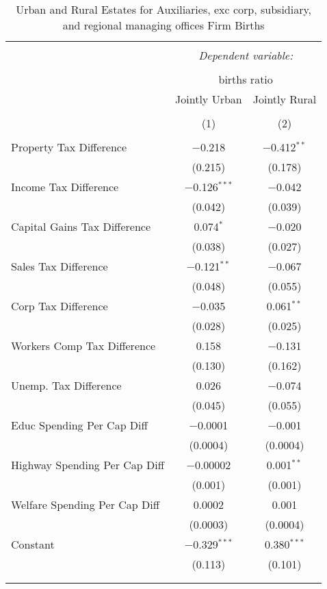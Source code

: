 
\begin{table}[!htbp] \centering 
  \caption{Urban and Rural Estates for  Auxiliaries, exc corp, subsidiary, and regional managing offices Firm Births} 
  \label{} 
\begin{tabular}{@{\extracolsep{5pt}}lcc} 
\\[-1.8ex]\hline 
\hline \\[-1.8ex] 
 & \multicolumn{2}{c}{\textit{Dependent variable:}} \\ 
\cline{2-3} 
\\[-1.8ex] & \multicolumn{2}{c}{births ratio} \\ 
 & Jointly Urban & Jointly Rural \\ 
\\[-1.8ex] & (1) & (2)\\ 
\hline \\[-1.8ex] 
 Property Tax Difference & $-$0.218 & $-$0.412$^{**}$ \\ 
  & (0.215) & (0.178) \\ 
  Income Tax Difference & $-$0.126$^{***}$ & $-$0.042 \\ 
  & (0.042) & (0.039) \\ 
  Capital Gains Tax Difference & 0.074$^{*}$ & $-$0.020 \\ 
  & (0.038) & (0.027) \\ 
  Sales Tax Difference & $-$0.121$^{**}$ & $-$0.067 \\ 
  & (0.048) & (0.055) \\ 
  Corp Tax Difference & $-$0.035 & 0.061$^{**}$ \\ 
  & (0.028) & (0.025) \\ 
  Workers Comp Tax Difference & 0.158 & $-$0.131 \\ 
  & (0.130) & (0.162) \\ 
  Unemp. Tax Difference & 0.026 & $-$0.074 \\ 
  & (0.045) & (0.055) \\ 
  Educ Spending Per Cap Diff & $-$0.0001 & $-$0.001 \\ 
  & (0.0004) & (0.0004) \\ 
  Highway Spending Per Cap Diff & $-$0.00002 & 0.001$^{**}$ \\ 
  & (0.001) & (0.001) \\ 
  Welfare Spending Per Cap Diff & 0.0002 & 0.001 \\ 
  & (0.0003) & (0.0004) \\ 
  Constant & $-$0.329$^{***}$ & 0.380$^{***}$ \\ 
  & (0.113) & (0.101) \\ 
 \hline \\[-1.8ex] 
\hline 
\hline \\[-1.8ex] 
\end{tabular} 
\end{table} 

